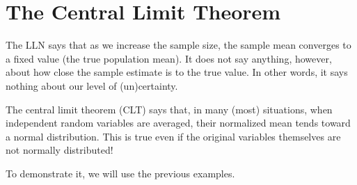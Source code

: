 \section{The Central Limit Theorem}
The LLN says that as we increase the sample size, the sample mean converges to a fixed value (the true population mean).  It does not say anything, however, about how close the sample estimate is to the true value. In other words, it says nothing about our level of (un)certainty. 

The central limit theorem (CLT) says that, in many (most) situations, when independent random variables are averaged, their normalized mean tends toward a normal distribution. This is true even if the original variables themselves are not normally distributed!

To demonstrate it, we will use the previous examples.

